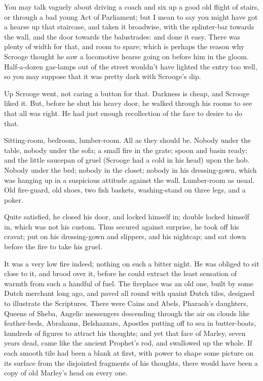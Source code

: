You may talk vaguely about driving a coach and six up a good old flight
of stairs, or through a bad young Act of Parliament; but I mean to say
you might have got a hearse up that staircase, and taken it broadwise,
with the splinter-bar towards the wall, and the door towards the
balustrades: and done it easy. There was plenty of width for that, and
room to spare; which is perhaps the reason why Scrooge thought he saw a
locomotive hearse going on before him in the gloom. Half-a-dozen
gas-lamps out of the street wouldn't have lighted the entry too well, so
you may suppose that it was pretty dark with Scrooge's dip.

Up Scrooge went, not caring a button for that. Darkness is cheap, and
Scrooge liked it. But, before he shut his heavy door, he walked through
his rooms to see that all was right. He had just enough recollection of
the face to desire to do that.

Sitting-room, bedroom, lumber-room. All as they should be. Nobody under
the table, nobody under the sofa; a small fire in the grate; spoon and
basin ready; and the little saucepan of gruel (Scrooge had a cold in his
head) upon the hob. Nobody under the bed; nobody in the closet; nobody
in his dressing-gown, which was hanging up in a suspicious attitude
against the wall. Lumber-room as usual. Old fire-guard, old shoes, two
fish baskets, washing-stand on three legs, and a poker.


Quite satisfied, he closed his door, and locked himself in; double
locked himself in, which was not his custom. Thus secured against
surprise, he took off his cravat; put on his dressing-gown and slippers,
and his nightcap; and sat down before the fire to take his gruel.

It was a very low fire indeed; nothing on such a bitter night. He was
obliged to sit close to it, and brood over it, before he could extract
the least sensation of warmth from such a handful of fuel. The fireplace
was an old one, built by some Dutch merchant long ago, and paved all
round with quaint Dutch tiles, designed to illustrate the Scriptures.
There were Cains and Abels, Pharaoh's daughters, Queens of Sheba,
Angelic messengers descending through the air on clouds like
feather-beds, Abrahams, Belshazzars, Apostles putting off to sea in
butter-boats, hundreds of figures to attract his thoughts; and yet that
face of Marley, seven years dead, came like the ancient Prophet's rod,
and swallowed up the whole. If each smooth tile had been a blank at
first, with power to shape some picture on its surface from the
disjointed fragments of his thoughts, there would have been a copy of
old Marley's head on every one.

